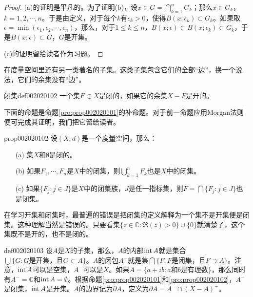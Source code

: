 \begin{proof}
(a)的证明是平凡的。为了证明(b)，设$x \in G = \bigcap_{k=1}^{n}{G_k}$；那么$x \in G_k$，$k=1,2,\cdots,n$。于是由定义，对于每个$k$有$\epsilon_k > 0$，使得$B(x;\epsilon_k) \subset G_k$。如果取$\epsilon=\min(\epsilon_1,\epsilon_2,\cdots, \epsilon_n)$，那么，对于$1 \le k \le n$，$B(x;\epsilon) \subset B(x;\epsilon_k) \subset G_k$，于是$B(x; \epsilon) \subset G$，$G$是开集。

(c)的证明留给读者作为习题。
\end{proof}

在度量空间里还有另一类著名的子集。这类子集包含它们的全部“边”，换一个说法，它们的余集没有“边”。

\begin{definition}{闭集}{def002020102}
一个集$F \subset X$是闭的，如果它的余集$X-F$是开的。
\end{definition}

下面的命题是命题\ref{pro:prop002020101}的补命题。对于前一命题应用Morgan法则便可完成其证明，我们把它留给读者。

\begin{proposition}{}{prop002020102}
设$(X, d)$是一个度量空间，那么：
\begin{enumerate}
\item[(a)]集$X$和$\emptyset$是闭的。
\item[(b)]如果$F_1,\cdots, F_n$是$X$中的闭集，则$\bigcup_{k=1}^{n}{F_k}$也是$X$中的闭集。
\item[(c)]如果$\{F_j:j \in J\}$是$X$中的闭集族，$J$是任一指标集，则$F = \bigcap\{F_j:j \in J\}$也是闭集。
\end{enumerate}
\end{proposition}

在学习开集和闭集时，最普遍的错误是把闭集的定义解释为一个集不是开集便是闭集。这种理解当然是错误的。只要看集$\{z \in \mathbb{C} : \Re{(z)} > 0\} \cup \{0\}$就清楚了，这个集既不是开的，也不是闭的。

\begin{definition}{}{def002020103}
设$A$是$X$的子集，那么，$A$的内部$\operatorname{int}{A}$就是集合$\bigcup\{G: G\text{是开集，且}G \subset A\}$。$A$的闭包$A^-$就是集$\bigcap\{F: F\text{是闭集，且}F \supset A\}$。注意，$\operatorname{int}{A}$可以是空集，$A^-$可以是$X$。如果$A = \{a + ib : a\text{和}b\text{是有理数}\}$，那么同时有$A^-=\mathbb{C}$和$\operatorname{int}{A} = \emptyset$。根据命题\ref{pro:prop002020101}和\ref{pro:prop002020102}，$A^-$是闭集，$\operatorname{int}{A}$是开集。$A$的边界记为$\partial{A}$，定义为$\partial{A} = A^- \cap (X-A)^-$。
\end{definition}

